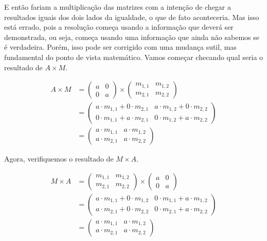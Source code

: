 \documentclass[main.tex]{subfiles}
\begin{document}
E então fariam a multiplicação das matrizes com a intenção de chegar a resultados iguais dos dois lados da igualdade, o que de fato aconteceria. Mas isso está errado, pois a resolução começa usando a informação que deverá ser demonstrada, ou seja, começa usando uma informação que ainda não sabemos se é verdadeira. Porém, isso pode ser corrigido com uma mudança sutil, mas fundamental do ponto de vista matemático. Vamos começar checando qual seria o resultado de $A \times M$.

\begin{equation*}\begin{align}
A \times M & {} = \begin{pmatrix}a & 0 \\ 0 & a\end{pmatrix} \times \begin{pmatrix}m_{1,1} & m_{1,2} \\ m_{2,1} & m_{2,2}\end{pmatrix} \\
& {} = \begin{pmatrix}a \cdot m_{1,1} + 0 \cdot m_{2,1} & a \cdot m_{1,2} + 0 \cdot m_{2,2} \\  0 \cdot m_{1,1} + a \cdot m_{2,1} & 0 \cdot m_{1,2} + a \cdot m_{2,2}\end{pmatrix} \\
& {} = \begin{pmatrix}a \cdot m_{1,1} & a \cdot m_{1,2} \\ a \cdot m_{2,1} & a \cdot m_{2,2}\end{pmatrix}
\end{align}\end{equation*}

Agora, verifiquemos o resultado de $M \times A$.

\begin{equation*}\begin{align}
M \times A & {} = \begin{pmatrix}m_{1,1} & m_{1,2} \\ m_{2,1} & m_{2,2}\end{pmatrix} \times \begin{pmatrix}a & 0 \\ 0 & a\end{pmatrix} \\
& {} = \begin{pmatrix}a \cdot m_{1,1} + 0 \cdot m_{1,2} & 0 \cdot m_{1,1} + a \cdot m_{1,2} \\  a \cdot m_{2,1} + 0 \cdot m_{2,2} & 0 \cdot m_{2,1} + a \cdot m_{2,2}\end{pmatrix} \\
& {} = \begin{pmatrix}a \cdot m_{1,1} & a \cdot m_{1,2} \\ a \cdot m_{2,1} & a \cdot m_{2,2}\end{pmatrix}
\end{align}\end{equation*}
\end{document}
